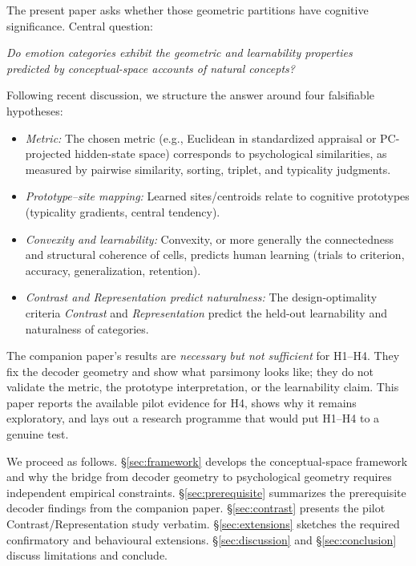 \documentclass[11pt]{article}
\begin{document}
The present paper asks whether those geometric partitions have cognitive significance. Central question:

\begin{center}
\emph{Do emotion categories exhibit the geometric and learnability properties\\ predicted by conceptual-space accounts of natural concepts?}
\end{center}

Following recent discussion, we structure the answer around four falsifiable hypotheses:

\begin{itemize}
\item[\emph{H1.}] \emph{Metric:} The chosen metric (e.g., Euclidean in standardized appraisal or PC-projected hidden-state space) corresponds to psychological similarities, as measured by pairwise similarity, sorting, triplet, and typicality judgments.
\item[\emph{H2.}] \emph{Prototype--site mapping:} Learned sites/centroids relate to cognitive prototypes (typicality gradients, central tendency).
\item[\emph{H3.}] \emph{Convexity and learnability:} Convexity, or more generally the connectedness and structural coherence of cells, predicts human learning (trials to criterion, accuracy, generalization, retention).
\item[\emph{H4.}] \emph{Contrast and Representation predict naturalness:} The design-optimality criteria \emph{Contrast} and \emph{Representation} \citep{douven-gardenfors-2020} predict the held-out learnability and naturalness of categories.
\end{itemize}

The companion paper's results are \emph{necessary but not sufficient} for H1--H4. They fix the decoder geometry and show what parsimony looks like; they do not validate the metric, the prototype interpretation, or the learnability claim. This paper reports the available pilot evidence for H4, shows why it remains exploratory, and lays out a research programme that would put H1--H4 to a genuine test.

We proceed as follows. \S\ref{sec:framework} develops the conceptual-space framework and why the bridge from decoder geometry to psychological geometry requires independent empirical constraints. \S\ref{sec:prerequisite} summarizes the prerequisite decoder findings from the companion paper. \S\ref{sec:contrast} presents the pilot Contrast/Representation study verbatim. \S\ref{sec:extensions} sketches the required confirmatory and behavioural extensions. \S\ref{sec:discussion} and \S\ref{sec:conclusion} discuss limitations and conclude.
\end{document}
